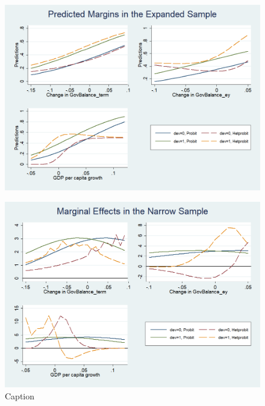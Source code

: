 \documentclass{beamer}
\begin{document}
\begin{frame}
 \begin{figure}
    \centering
    \includegraphics[width=1\textwidth]{Predicted_Expanded.png}

\end{figure}   
\end{frame}
\begin{frame}
    \begin{figure}
        \centering
        \includegraphics[width=1\textwidth]{AME_Narrow.png}
        \caption{Caption}
        \label{fig:my_label}
    \end{figure}
\end{frame}
\end{document}
